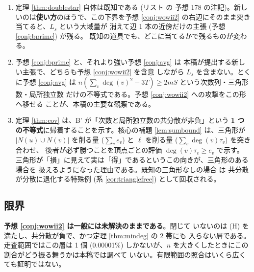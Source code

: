 \documentclass[paper=a4,fontsize=10.5pt,jafontsize=10.5pt]{jlreq}
\theoremstyle{plain}
\theoremstyle{definition}
\begin{document}
\begin{enumerate}
\item 定理 \ref{thm:doublestar} 自体は既知である (リスト \cite{wowii} の
  予想 178 の注記)。新しいのは\textbf{使い方}のほうで、この下界を予想
  \ref{conj:wowii2} の右辺にそのまま突き当てると、$L_s$ という大域量が
  消えて辺 1 本の近傍だけの主張 (予想 \ref{conj:bprime}) が残る。
  既知の道具でも、どこに当てるかで残るものが変わる。
\item 予想 \ref{conj:bprime} と、それより強い予想 \ref{conj:avg} は
  本稿が提出する新しい主張で、どちらも予想 \ref{conj:wowii2} を含意
  しながら $L_s$ を含まない。とくに予想 \ref{conj:avg} は
  $n(\sum_v \deg(v)^2 - 3T) \ge 2mS$ という次数列・三角形数・局所独立数
  だけの不等式である。予想 \ref{conj:wowii2} への攻撃をこの形へ移せる
  ことが、本稿の主要な観察である。
\item 定理 \ref{thm:cov} は、B' が「次数と局所独立数の共分散が非負」という
  \textbf{1 つの不等式}に帰着することを示す。核心の補題
  \ref{lem:sumbound} は、三角形が $|N(u) \cup N(v)|$ を削る量
  ($\sum_v e_v$) と $\ell$ を削る量 ($\sum_v \deg(v)\tau_v$) を突き合わせ、
  後者が必ず勝つことを頂点ごとの評価 $\deg(v)\tau_v \ge e_v$ で示す。
  三角形が「損」に見えて実は「得」であるというこの向きが、三角形のある場合を
  扱えるようになった理由である。既知の三角形なしの場合 \cite{mukwembi} は
  共分散が分散に退化する特殊例 (系 \ref{cor:trianglefree}) として回収される。
\end{enumerate}

\subsection*{限界}

\textbf{予想 \ref{conj:wowii2} は一般には未解決のままである}。閉じて
いないのは (H) を満たし、共分散が負で、かつ定理 \ref{thm:mindeg} の 2 帯にも
入らない層である。走査範囲ではこの層は 1 個 (0.00001\%)
しかないが、$n$ を大きくしたときにこの割合がどう振る舞うかは本稿では調べて
いない。有限範囲の照合はいくら広くても証明ではない。
\end{document}
